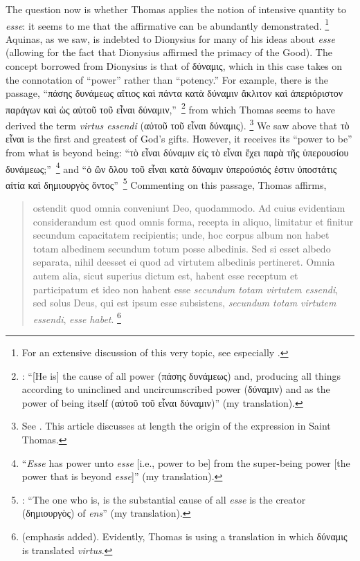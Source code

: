 The question now is whether Thomas applies the notion of intensive quantity to \emph{esse}: it seems to me that the affirmative can be abundantly demonstrated.%
%
\footnote{For an extensive discussion of this very topic, see especially \cite{orourke:virtus}.} Aquinas, as we saw, is indebted to Dionysius for many of his ideas about \emph{esse} (allowing for the fact that Dionysius affirmed the primacy of the Good). The concept borrowed from Dionysius is that of δύναμις, which in this case takes on the connotation of “power” rather than “potency.” For example, there is the passage, “πάσης δυνάμεως αἴτιος καὶ πάντα κατὰ δύναμιν ἄκλιτον καὶ ἀπεριόριστον παράγων καὶ ὡς αὐτοῦ τοῦ εἶναι δύναμιν,”\,%
%
\footnote{\Cite[8, 2]{pg:dionysius:DN}: “[He is] the cause of all power (πάσης δυνάμεως) and, producing all things according to uninclined and uncircumscribed power (δύναμιν) and as the power of being itself (αὐτοῦ τοῦ εἶναι δύναμιν)” (my translation). }
%
from which Thomas seems to have derived the term \emph{virtus essendi} (αὐτοῦ τοῦ εἶναι δύναμις).%
%
\footnote{See \cite[1]{gilson:virtus}. This article discusses at length the origin of the expression in Saint Thomas.}
%
We saw above that τὸ εἶναι is the first and greatest of God’s gifts. However, it receives its “power to be” from what is beyond being: “τὸ εἶναι δύναμιν εἰς τὸ εἶναι ἔχει παρὰ τῆς ὑπερ\-ουσίου δυνάμεως;”\,%
%
\footnote{\Cite[8, 3]{pg:dionysius:DN} “\emph{Esse} has power unto \emph{esse} [i.e., power to be] from the super-being power [the power that is beyond \emph{esse}]” (my translation).} and “ὁ ὢν ὅλου τοῦ εἶναι κατὰ δύναμιν ὑπερ\-ούσιός ἐστιν ὑποστάτις αἰτία καὶ δημιουργὸς ὄντος”\,%
%
\footnote{\Cite[5, 4]{pg:dionysius:DN}: “The one who is, is the substantial cause of all \emph{esse} is the creator (δημιουργὸς) of \emph{ens}” (my translation).} Commenting on this passage, Thomas affirms,
%
\begin{quotation}
ostendit quod omnia conveniunt Deo, quodammodo. Ad cuius evidentiam considerandum est quod omnis forma, recepta in aliquo, limitatur et finitur secundum capacitatem recipientis; unde, hoc corpus album non habet totam albedinem secundum totum posse albedinis. Sed si esset albedo separata, nihil deesset ei quod ad virtutem albedinis pertineret. Omnia autem alia, sicut superius dictum est, habent esse receptum et participatum et ideo non habent esse \emph{secundum totam virtutem essendi}, sed solus Deus, qui est ipsum esse subsistens, \emph{secundum totam virtutem essendi}, \emph{esse habet}.%
%
\footnote{\Cite[V, lc.~1, 629]{st:divnomin} (emphasis added). Evidently, Thomas is using a translation in which δύναμις is translated \emph{virtus}.}
\end{quotation}
